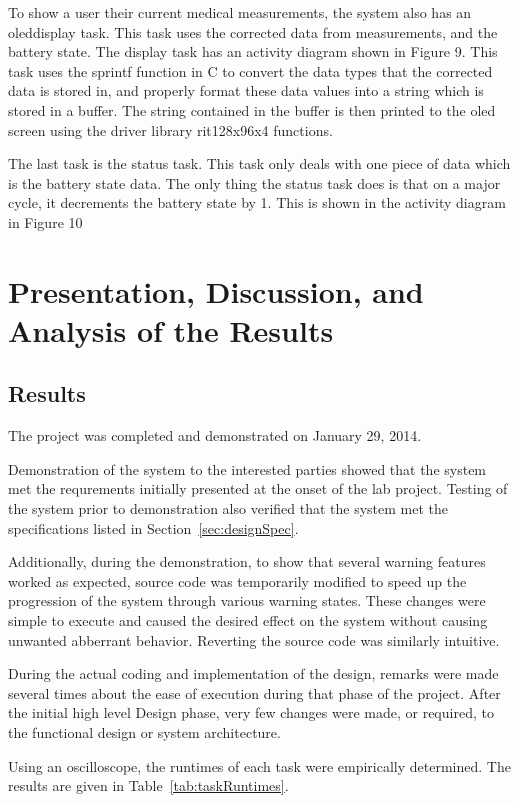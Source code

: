 \documentclass[12pt]{article} %
\begin{document}
To show a user their current medical measurements, the system also has an
oleddisplay task. This task uses the corrected data from measurements, and the
battery state. The display task has an activity diagram shown in Figure 9. This
task uses the sprintf function in C to convert the data types that the
corrected data is stored in, and properly format these data values into a
string which is stored in a buffer. The string contained in the buffer is then
printed to the oled screen using the driver library rit128x96x4 functions.

The last task is the status task. This task only deals with one piece of data
which is the battery state data. The only thing the status task does is that on
a major cycle, it decrements the battery state by 1. This is shown in the
activity diagram in Figure 10

\section{Presentation, Discussion, and Analysis of the Results}

\subsection{Results}
The project was completed and demonstrated on January 29, 2014.

Demonstration of the system to the interested parties showed that the system met the requrements initially presented at the onset of the lab project.
Testing of the system prior to demonstration also verified that the system met the specifications listed in Section~\ref{sec:designSpec}.

Additionally, during the demonstration, to show that several warning features worked as expected, source code was temporarily modified to speed up the progression of the system through various warning states. These changes were simple to execute and caused the desired effect on the system without causing unwanted abberrant behavior. Reverting the source code was similarly intuitive.

During the actual coding and implementation of the design, remarks were made several times about the ease of execution during that phase of the project. After the initial high level Design phase, very few changes were made, or required, to the functional design or system architecture.

Using an oscilloscope, the runtimes of each task were empirically determined. The results are given in Table~\ref{tab:taskRuntimes}.
\end{document}
